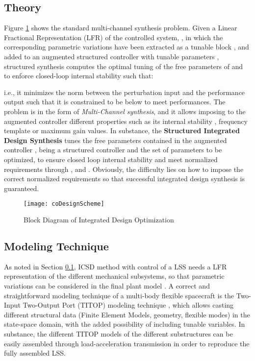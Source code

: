 \documentclass{ifacconf}
\begin{document}
\subsection{Theory}
\label{subsec:hinf}
Figure \ref{fig:coDesignScheme} shows the standard multi-channel  synthesis problem. Given a Linear Fractional Representation (LFR) of the controlled system, , in which the corresponding parametric variations have been extracted as a tunable block , and added to an augmented structured controller with tunable parameters , structured  synthesis computes the optimal tuning of the free parameters of  and  to enforce closed-loop internal stability such that:




i.e., it minimizes the  norm between the perturbation input  and the performance output  such that it is constrained to be below  to meet performances. The problem is in the form of \emph{Multi-Channel  synthesis}, and it allows imposing to the augmented controller different properties such as its internal stability \citep{Alazard2013_ID}, frequency template \citep{Loquen2012_Hinf} or maximum gain values. In substance, the \textbf{Structured  Integrated Design Synthesis} tunes the free parameters contained in the augmented controller ,  being a structured controller and  the set of parameters to be optimized, to ensure closed loop internal stability and meet normalized  requirements through ,  and . Obviously, the difficulty lies on how to impose the correct normalized  requirements so that successful integrated design synthesis is guaranteed.   

\begin{figure} 
\centering
\texttt{[image: coDesignScheme]}
\caption{Block Diagram of Integrated Design Optimization}
\label{fig:coDesignScheme}
\end{figure}

\subsection{Modeling Technique}
\label{subsec:modelingTechnique}

As noted in Section \ref{subsec:hinf}, ICSD method with  control of a LSS needs a LFR representation of the different mechanical subsystems, so that parametric variations can be considered in the final plant model . A correct and straightforward modeling technique of a multi-body flexible spacecraft is the Two-Input Two-Output Port (TITOP) modeling technique \citep{Perez2015_LM, Alazard2015_LM, perez_IFAtheory2015, perez_IFAapply2015}, which allows casting different structural data (Finite Element Models, geometry, flexible modes) in the state-space domain, with the added possibility of including tunable variables. In substance, the different TITOP models of the different substructures can be easily assembled through load-acceleration transmission in order to reproduce the fully assembled LSS. 
\end{document}
